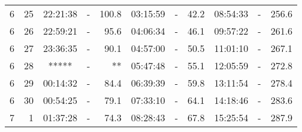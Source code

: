 \documentclass[12pt,a4j]{jsarticle}
\begin{document}
\begin{table}[htb]
\begin{center}
\begin{tabular}{rr|ccr|ccr|ccr}
 6&25&22:21:38&-&100.8&03:15:59&-&42.2&08:54:33&-&256.6\\ 
 6&26&22:59:21&-& 95.6&04:06:34&-&46.1&09:57:22&-&261.6\\ 
 6&27&23:36:35&-& 90.1&04:57:00&-&50.5&11:01:10&-&267.1\\ 
 6&28&  *****  &-& ** &05:47:48&-&55.1&12:05:59&-&272.8\\ 
 6&29&00:14:32&-& 84.4&06:39:39&-&59.8&13:11:54&-&278.4\\ 
 6&30&00:54:25&-& 79.1&07:33:10&-&64.1&14:18:46&-&283.6\\ 
 7& 1&01:37:28&-& 74.3&08:28:43&-&67.8&15:25:54&-&287.9\\ 
\end{tabular}
\end{center}
\end{table}
\end{document}
